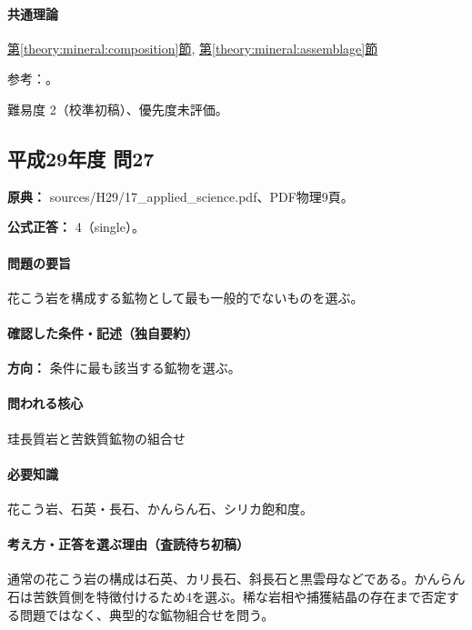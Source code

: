 \paragraph{共通理論} \hyperref[theory:mineral:composition]{第\ref*{theory:mineral:composition}節}, \hyperref[theory:mineral:assemblage]{第\ref*{theory:mineral:assemblage}節}

\par 参考：\cite{hom_albite,hom_anorthite,usgs_igneous_components}。

\par 難易度 2（校準初稿）、優先度未評価。

\subsection{平成29年度 問27}
\label{q:h29-reg-applied-27}

\noindent\textbf{原典：} sources/H29/17\_applied\_science.pdf、PDF物理9頁。

\textbf{公式正答：} 4（single）。

\paragraph{問題の要旨} 花こう岩を構成する鉱物として最も一般的でないものを選ぶ。

\paragraph{確認した条件・記述（独自要約）}\mbox{}\par

\noindent\textbf{方向：} 条件に最も該当する鉱物を選ぶ。\par

\paragraph{問われる核心} 珪長質岩と苦鉄質鉱物の組合せ

\paragraph{必要知識} 花こう岩、石英・長石、かんらん石、シリカ飽和度。

\paragraph{考え方・正答を選ぶ理由（査読待ち初稿）} 通常の花こう岩の構成は石英、カリ長石、斜長石と黒雲母などである。かんらん石は苦鉄質側を特徴付けるため4を選ぶ。稀な岩相や捕獲結晶の存在まで否定する問題ではなく、典型的な鉱物組合せを問う。

